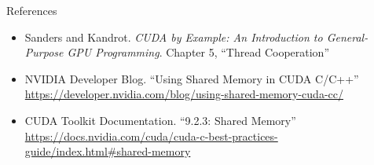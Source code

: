 \documentclass{beamer}
\begin{document}
    \begin{frame}{References}
        \begin{itemize}
            \item Sanders and Kandrot.  \textit{CUDA by Example: An Introduction to General-Purpose GPU Programming}.
            Chapter 5, ``Thread Cooperation''
            \item NVIDIA Developer Blog.  ``Using Shared Memory in CUDA C/C++''  \url{https://developer.nvidia.com/blog/using-shared-memory-cuda-cc/}
            \item CUDA Toolkit Documentation.  ``9.2.3: Shared Memory''  \url{https://docs.nvidia.com/cuda/cuda-c-best-practices-guide/index.html\#shared-memory}
        \end{itemize}
    \end{frame}
\end{document}
